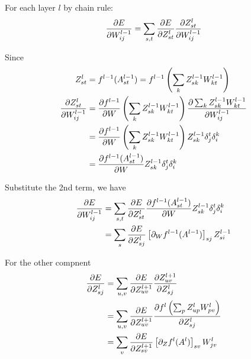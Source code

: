 \documentclass[14pt,letter,oneside]{article}
\begin{document}
	 For each layer $l$ by chain rule:
	 $$
	   \pdv{E}{W^{l-1}_{ij}} = \sum_{s,t} \pdv{E}{Z^l_{st}} \pdv{Z^l_{st}}{W^{l-1}_{ij}}
	 $$
	 
	 Since \begin{align*}
			 Z^l_{st} &= f^{l-1}(A^{l-1}_{st}) = f^{l-1} \left( \sum_k Z^{l-1}_{sk}W^{l-1}_{kt}\right) \\
			 \pdv{Z^l_{st}}{W^{l-1}_{ij}} &= \pdv{f^{l-1}}{W} \left(\sum_k Z^{l-1}_{sk}W^{l-1}_{kt} \right) \pdv{\sum_k Z^{l-1}_{sk}W^{l-1}_{kt}}{W^{l-1}_{ij}} \\
			 &= \pdv{f^{l-1}}{W} \left(\sum_k Z^{l-1}_{sk}W^{l-1}_{kt} \right) Z^{l-1}_{sk} \delta^t_j \delta^k_i\\\
			 &= \pdv{f^{l-1}(A^{l-1}_{st})}{W}  Z^{l-1}_{sk} \delta^t_j \delta^k_i\\
	 \end{align*} 
	 
	 Substitute the 2nd term, we have 
	 \begin{align*}
		 \pdv{E}{W^{l-1}_{ij}} &= \sum_{s,t} \pdv{E}{Z^l_{st}} \pdv{f^{l-1}(A^{l-1}_{st})}{W}  Z^{l-1}_{sk} \delta^t_j \delta^k_i \\
		 &= \sum_{s} \pdv{E}{Z^l_{sj}} \left[ \partial_W{f^{l-1}(A^{l-1})} \right]_{sj} Z^{l-1}_{si} \\
	 \end{align*}
	 
	 
	 For the other compnent
	 \begin{align*}
		  \pdv{E}{Z^l_{sj}} &= \sum_{u,v} \pdv{E}{Z^{l+1}_{uv}} \pdv{Z^{l+1}_{uv}}{Z^l_{sj}} \\
				 &= \sum_{u,v} \pdv{E}{Z^{l+1}_{uv}} \pdv{f^l \left(\sum_{p} Z^l_{up}W^l_{pv} \right)}{Z^l_{sj}} \\
				 &= \sum_{v} \pdv{E}{Z^{l+1}_{sv}} \left[ \partial_Z{f^l(A^{l})} \right]_{sv} W^l_{jv} \\
	 \end{align*}
	 

	
\end{document}
